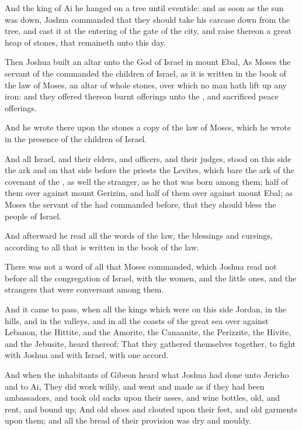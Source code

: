 \Verse And the king of Ai he hanged on a tree until eventide: and as soon as the sun was down, Joshua commanded that they should take his carcase down from the tree, and cast it at the entering of the gate of the city, and raise thereon a great heap of stones, that remaineth unto this day.

\Verse Then Joshua built an altar unto the \LORD God of Israel in mount Ebal, \Verse As Moses the servant of the \LORD commanded the children of Israel, as it is written in the book of the law of Moses, an altar of whole stones, over which no man hath lift up any iron: and they offered thereon burnt offerings unto the \LORD, and sacrificed peace offerings.

\Verse And he wrote there upon the stones a copy of the law of Moses, which he wrote in the presence of the children of Israel.

\Verse And all Israel, and their elders, and officers, and their judges, stood on this side the ark and on that side before the priests the Levites, which bare the ark of the covenant of the \LORD, as well the stranger, as he that was born among them; half of them over against mount Gerizim, and half of them over against mount Ebal; as Moses the servant of the \LORD had commanded before, that they should bless the people of Israel.

\Verse And afterward he read all the words of the law, the blessings and cursings, according to all that is written in the book of the law.

\Verse There was not a word of all that Moses commanded, which Joshua read not before all the congregation of Israel, with the women, and the little ones, and the strangers that were conversant among them.


\Chapter
\Verse And it came to pass, when all the kings which were on this side Jordan, in the hills, and in the valleys, and in all the coasts of the great sea over against Lebanon, the Hittite, and the Amorite, the Canaanite, the Perizzite, the Hivite, and the Jebusite, heard thereof; \Verse That they gathered themselves together, to fight with Joshua and with Israel, with one accord.

\Verse And when the inhabitants of Gibeon heard what Joshua had done unto Jericho and to Ai, \Verse They did work wilily, and went and made as if they had been ambassadors, and took old sacks upon their asses, and wine bottles, old, and rent, and bound up; \Verse And old shoes and clouted upon their feet, and old garments upon them; and all the bread of their provision was dry and mouldy.

